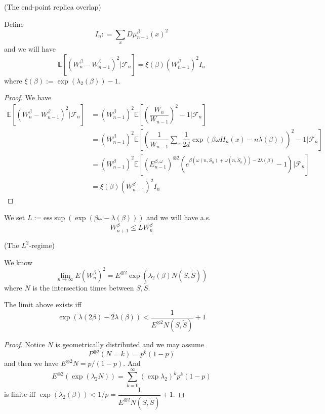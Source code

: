 \begin{definition}
    (The end-point replica overlap)\par
    Define \[I_n : = \sum\limits_x D\mu_{n-1}^{\beta}(x)^2\] and we will have
    \[
    \mathbb{E}[(W_n^{\beta} - W_{n-1}^{\beta})^2|\mathcal{F}_n] = \xi(\beta)(W_{n-1}^{\beta})^2 I_n
    \]
    where $\xi(\beta) := \exp(\lambda_2(\beta)) - 1$.
\end{definition}
\begin{proof}
    We have
    \[\begin{aligned}
        \mathbb{E}[(W_n^{\beta} - W_{n-1}^{\beta})^2|\mathcal{F}_n] &= (W_{n-1}^{\beta})^2 \mathbb{E}\left[\left(\dfrac{W_n}{W_{n-1}}\right)^2 - 1| \mathcal{F}_n\right] \\
        &= (W_{n-1}^{\beta})^2 \mathbb{E}\left[\left(\dfrac{1}{W_{n-1}}\sum\limits_x \dfrac{1}{2d} \exp(\beta\omega H_n(x) - n\lambda(\beta))\right)^2 - 1| \mathcal{F}_n\right] \\
        &= (W_{n-1}^{\beta})^2 \mathbb{E}\left[(E^{\beta,\omega}_{n-1})^{\otimes 2}(e^{\beta(\omega(n,S_n)+\omega(n,\tilde{S}_n)) - 2\lambda(\beta)}-1)| \mathcal{F}_n\right] \\
        &= \xi(\beta)(W_{n-1}^{\beta})^2I_n
    \end{aligned}
    \]
\end{proof}

\begin{definition}
    We set $L:=\text{ess}\sup(\exp(\beta\omega -\lambda(\beta)))$ and we will have a.s.
    \[
    W_{n+1}^{\beta} \leq L W_n^{\beta}
    \]
\end{definition}

\begin{definition}
    (The $L^2$-regime)\par
    We know
    \[
    \lim_{n\to\infty} E (W_n^{\beta})^2 = E^{\otimes 2}\exp(\lambda_2(\beta) N(S,\tilde{S}))
    \]
    where $N$ is the intersection times between $S,\tilde{S}$.
\end{definition}

\begin{proposition}
    The limit above exists iff
    \[
    \exp(\lambda(2\beta) - 2\lambda(\beta)) < \dfrac{1}{E^{\otimes 2} N(S,\tilde{S})} + 1
    \]
\end{proposition}
\begin{proof}
    Notice $N$ is geometrically distributed and we may assume
    \[
    P^{\otimes 2}(N = k) = p^k(1-p)
    \]
    and then we have $E^{\otimes 2} N = p/(1-p)$. And 
    \[
    E^{\otimes 2}(\exp(\lambda_2 N)) = \sum\limits_{k=0}^{\infty}(\exp{\lambda_2})^kp^k(1-p)
    \]
    is finite iff $\exp(\lambda_2(\beta)) < 1/p = \dfrac{1}{E^{\otimes 2}N(S,\tilde{S})} + 1$.
\end{proof}

